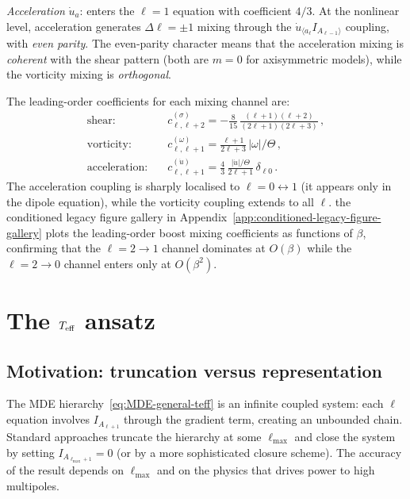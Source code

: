 \emph{Acceleration} $\dot{u}_a$: enters the $\ell = 1$
equation with coefficient $4/3$.  At the nonlinear level,
acceleration generates $\Delta\ell = \pm 1$ mixing through the
$\dot{u}_{\langle a_\ell}I_{A_{\ell-1}\rangle}$ coupling, with
\emph{even parity}.  The even-parity character means that the
acceleration mixing is \emph{coherent} with the shear pattern
(both are $m = 0$ for axisymmetric models), while the vorticity
mixing is \emph{orthogonal}.

The leading-order coefficients for each mixing channel are:
\begin{equation}\label{eq:mixing-coefficients}
\begin{aligned}
\text{shear:}\quad &
  c_{\ell,\ell+2}^{(\sigma)}
  = -\frac{8}{15}\,
    \frac{(\ell+1)(\ell+2)}{(2\ell+1)(2\ell+3)}\,,\\[3pt]
\text{vorticity:}\quad &
  c_{\ell,\ell+1}^{(\omega)}
  = \frac{\ell+1}{2\ell+3}\,
    |\omega|/\Theta\,,\\[3pt]
\text{acceleration:}\quad &
  c_{\ell,\ell+1}^{(\dot{u})}
  = \frac{4}{3}\,
    \frac{|\dot{u}|/\Theta}{2\ell+1}\,\delta_{\ell 0}\,.
\end{aligned}
\end{equation}
The acceleration coupling is sharply localised to $\ell = 0
\leftrightarrow 1$ (it appears only in the dipole equation),
while the vorticity coupling extends to all $\ell$.
the conditioned legacy figure gallery in Appendix~\ref{app:conditioned-legacy-figure-gallery} plots the leading-order
boost mixing coefficients as functions of $\beta$, confirming that
the $\ell = 2 \to 1$ channel dominates at $O(\beta)$ while the
$\ell = 2 \to 0$ channel enters only at $O(\beta^2)$.


\section{The $T_{\mathrm{eff}}$ ansatz}\label{sec:teff-ansatz}

\subsection{Motivation: truncation versus representation}
\label{sec:trunc-rep}

The MDE hierarchy~\eqref{eq:MDE-general-teff} is an infinite coupled
system: each $\ell$ equation involves $I_{A_{\ell+1}}$ through
the gradient term, creating an unbounded chain.  Standard
approaches truncate the hierarchy at some $\ell_{\mathrm{max}}$
and close the system by setting
$I_{A_{\ell_{\mathrm{max}}+1}} = 0$ (or by a more sophisticated
closure scheme).  The accuracy of the result depends on
$\ell_{\mathrm{max}}$ and on the physics that drives power to
high multipoles.

